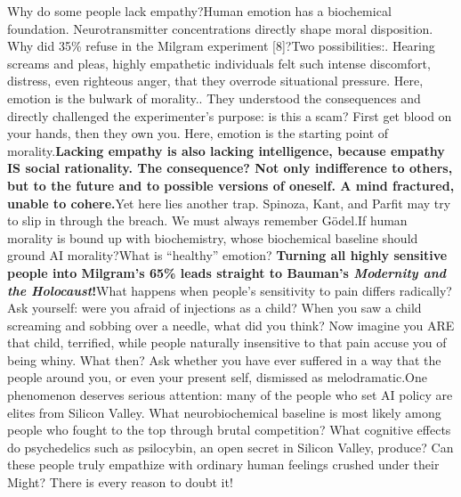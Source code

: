 \documentclass[11pt]{article}
\renewcommand{\\}[1][\mynewlineskip]{\oldnewline[#1]}
\begin{document}
\vspace{1em}
Why do some people lack empathy?\\
Human emotion has a biochemical foundation. Neurotransmitter concentrations directly shape moral disposition. Why did 35\% refuse in the Milgram experiment [8]?\\
Two possibilities:\\
1. Hearing screams and pleas, highly empathetic individuals felt such intense discomfort, distress, even righteous anger, that they overrode situational pressure. Here, emotion is the bulwark of morality.\\
2. They understood the consequences and directly challenged the experimenter's purpose: is this a scam? First get blood on your hands, then they own you. Here, emotion is the starting point of morality.\\
\textbf{Lacking empathy is also lacking intelligence, because empathy IS social rationality. The consequence? Not only indifference to others, but to the future and to possible versions of oneself. A mind fractured, unable to cohere.}\\
Yet here lies another trap. Spinoza, Kant, and Parfit may try to slip in through the breach. We must always remember Gödel.\\
If human morality is bound up with biochemistry, whose biochemical baseline should ground AI morality?\\
What is ``healthy'' emotion? \textbf{Turning all highly sensitive people into Milgram's 65\% leads straight to Bauman's \textit{Modernity and the Holocaust}!}\\
What happens when people's sensitivity to pain differs radically? Ask yourself: were you afraid of injections as a child? When you saw a child screaming and sobbing over a needle, what did you think? Now imagine you ARE that child, terrified, while people naturally insensitive to that pain accuse you of being whiny. What then? Ask whether you have ever suffered in a way that the people around you, or even your present self, dismissed as melodramatic.\\
One phenomenon deserves serious attention: many of the people who set AI policy are elites from Silicon Valley. What neurobiochemical baseline is most likely among people who fought to the top through brutal competition? What cognitive effects do psychedelics such as psilocybin, an open secret in Silicon Valley, produce? Can these people truly empathize with ordinary human feelings crushed under their Might? There is every reason to doubt it!\\
\end{document}
